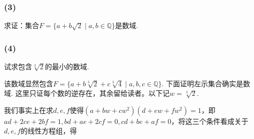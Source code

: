 \subsubsection{(3)}
求证：集合$F=\{a+b\sqrt{2}\mid a,b\in\mathbb{Q}\}$是数域.


\subsubsection{(4)}
试求包含$\sqrt[3]{2}$的最小的数域.

\jie 该数域显然包含$F=\{a+b\sqrt[3]{2}+c\sqrt[3]{4}\mid a,b,c\in\mathbb{Q}\}$. 下面证明左示集合确实是数域. 这里只证每个数的逆存在，其余留给读者。以下记$w=\sqrt[3]{2}$.

我们事实上在求$d,e,f$使得$(a+bw+cw^2)(d+ew+fw^2)=1$，即$ad+2ce+2bf=1, bd+ae+2cf=0, cd+be+af=0$，将这三个条件看成关于$d,e,f$的线性方程组，得
